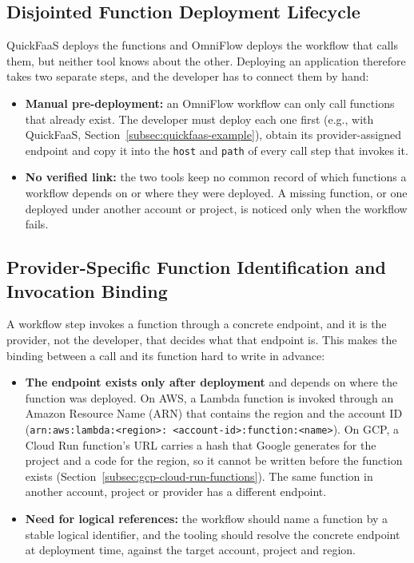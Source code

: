 \subsection{Disjointed Function Deployment Lifecycle}
QuickFaaS deploys the functions and OmniFlow deploys the workflow that calls them, but neither tool
knows about the other. Deploying an application therefore takes two separate steps, and the
developer has to connect them by hand:
\begin{itemize}
	\item \textbf{Manual pre-deployment:} an OmniFlow workflow can only call functions that already
	exist. The developer must deploy each one first (e.g., with QuickFaaS,
	Section~\ref{subsec:quickfaas-example}), obtain its provider-assigned endpoint and copy it into
	the \texttt{host} and \texttt{path} of every call step that invokes it.
	\item \textbf{No verified link:} the two tools keep no common record of which functions a
	workflow depends on or where they were deployed. A missing function, or one deployed under
	another account or project, is noticed only when the workflow fails.
\end{itemize}

\subsection{Provider-Specific Function Identification and Invocation Binding}
A workflow step invokes a function through a concrete endpoint, and it is the provider, not the
developer, that decides what that endpoint is. This makes the binding between a call and its
function hard to write in advance:
\begin{itemize}
	\item \textbf{The endpoint exists only after deployment} and depends on where the function was
	deployed. On AWS, a Lambda function is invoked through an Amazon Resource Name (ARN) that
	contains the region and the account ID
	(\texttt{arn:\allowbreak aws:\allowbreak lambda:\allowbreak <region>:\allowbreak%
	<account-id>:\allowbreak function:\allowbreak <name>}). On GCP, a Cloud Run function's URL
	carries a hash that Google generates for the project and a code for the region, so it cannot be
	written before the function exists (Section~\ref{subsec:gcp-cloud-run-functions}). The same
	function in another account, project or provider has a different endpoint.
	\item \textbf{Need for logical references:} the workflow should name a function by a stable
	logical identifier, and the tooling should resolve the concrete endpoint at deployment time,
	against the target account, project and region.
\end{itemize}

